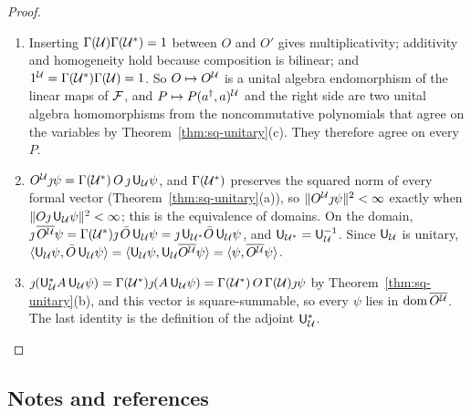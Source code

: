 \begin{vetdenv}
\begin{proof}
\begin{enumerate}
\item[(a)] Inserting $\Gamma(\mathcal U)\Gamma(\mathcal U^*)=1$ between $O$ and $O'$ gives multiplicativity; additivity and
homogeneity hold because composition is bilinear; and $1^\mathcal U=\Gamma(\mathcal U^*)\Gamma(\mathcal U)=1$. So $O\mapsto O^\mathcal U$ is a
unital algebra endomorphism of the linear maps of $\mathcal F$, and $P\mapsto P(a^\dagger,a)^\mathcal U$ and the right side are
two unital algebra homomorphisms from the noncommutative polynomials that agree on the variables by
Theorem~\ref{thm:sq-unitary}(c). They therefore agree on every $P$.
\item[(b)] $O^\mathcal U\jmath\psi=\Gamma(\mathcal U^*)\,O\,\jmath\,\mathsf U_\mathcal U\psi$, and $\Gamma(\mathcal U^*)$ preserves the squared norm of every
formal vector (Theorem~\ref{thm:sq-unitary}(a)), so $\lVert O^\mathcal U\jmath\psi\rVert^2<\infty$ exactly when
$\lVert O\jmath\,\mathsf U_\mathcal U\psi\rVert^2<\infty$; this is the equivalence of domains. On the domain,
$\jmath\,\overline{O^\mathcal U}\psi=\Gamma(\mathcal U^*)\jmath\,\bar O\,\mathsf U_\mathcal U\psi=\jmath\,\mathsf U_{\mathcal U^*}\bar O\,\mathsf U_\mathcal U\psi$, and
$\mathsf U_{\mathcal U^*}=\mathsf U_\mathcal U^{-1}$. Since $\mathsf U_\mathcal U$ is unitary, $\langle\mathsf U_\mathcal U\psi,\bar O\,\mathsf U_\mathcal U\psi\rangle=
\langle\mathsf U_\mathcal U\psi,\mathsf U_\mathcal U\overline{O^\mathcal U}\psi\rangle=\langle\psi,\overline{O^\mathcal U}\psi\rangle$.
\item[(c)] $\jmath(\mathsf U_\mathcal U^*A\,\mathsf U_\mathcal U\psi)=\Gamma(\mathcal U^*)\jmath(A\,\mathsf U_\mathcal U\psi)=\Gamma(\mathcal U^*)\,O\,\Gamma(\mathcal U)\jmath\psi$ by
Theorem~\ref{thm:sq-unitary}(b), and this vector is square-summable, so every $\psi$ lies in $\operatorname{dom}\overline{O^\mathcal U}$.
The last identity is the definition of the adjoint $\mathsf U_\mathcal U^*$.\qedhere
\end{enumerate}
\end{proof}

\subsection*{Notes and references}


\end{vetdenv}
